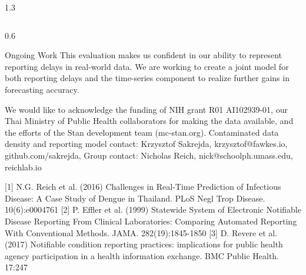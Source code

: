 \documentclass[final]{beamer}
\newlength{\onecolwid}
\begin{document}
\begin{frame}[t]
\begin{columns}[t]
\begin{column}{1.3\onecolwid}
\begin{columns}
\begin{column}{0.6\onecolwid}
\begin{block}{Ongoing Work}
This evaluation makes us confident in our ability to represent reporting delays in real-world data.  We are working to create a joint model for both reporting delays and the time-series component to realize further gains in forecasting accuracy.
\end{block}


\tiny{We would like to acknowledge the funding of NIH grant R01 AI102939-01, our Thai Ministry of Public Health collaborators for making the data available, and the efforts of the Stan development team (mc-stan.org).} \tiny{Contaminated data density and reporting model contact: Krzysztof Sakrejda, krzysztof@fawkes.io, github.com/sakrejda, Group contact: Nicholas Reich, nick@schoolph.umass.edu, reichlab.io}

\vspace{.2in}

\tiny [1] N.G. Reich et al. (2016) Challenges in Real-Time Prediction of Infectious Disease: A Case Study of Dengue in Thailand. PLoS Negl Trop Disease. 10(6):e0004761  \tiny [2] P. Effler et al. (1999) Statewide System of Electronic Notifiable Disease Reporting From Clinical Laboratories: Comparing Automated Reporting With Conventional Methods. JAMA. 282(19):1845-1850  \tiny [3] D. Revere et al. (2017) Notifiable condition reporting practices: implications for public health agency participation in a health information exchange. BMC Public Health. 17:247

\vspace{.2in}


\end{column}

\end{columns}

\end{column} 

\end{columns} %


\end{frame} %
\end{document}
